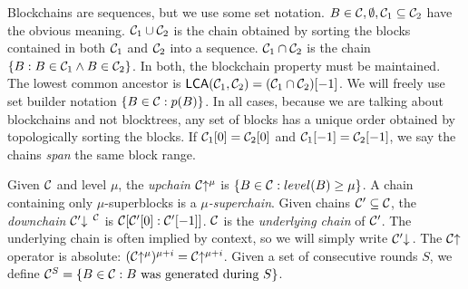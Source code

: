 Blockchains are sequences, but we use some set notation. $B \in \mathcal{C},
\emptyset, \mathcal{C}_1 \subseteq \mathcal{C}_2$ have the obvious meaning. $\mathcal{C}_1 \cup
\mathcal{C}_2$ is the chain obtained by sorting the blocks contained in both
$\mathcal{C}_1$ and $\mathcal{C}_2$ into a sequence. $\mathcal{C}_1 \cap \mathcal{C}_2$ is the chain
$\{B: B \in \mathcal{C}_1 \land B \in \mathcal{C}_2\}$. In both, the blockchain property
must be maintained. The lowest common ancestor is $\textsf{LCA}(\mathcal{C}_1,
\mathcal{C}_2) = (\mathcal{C}_1 \cap \mathcal{C}_2)[-1]$. We will freely use set builder
notation $\{B \in \mathcal{C}: p(B)\}$. In all cases, because we are talking about
blockchains and not blocktrees, any set of blocks has a unique order obtained by
topologically sorting the blocks. If $\mathcal{C}_1[0] = \mathcal{C}_2[0]$ and
$\mathcal{C}_1[-1] = \mathcal{C}_2[-1]$, we say the chains \textit{span} the same
block range.

Given $\mathcal{C}$ and level $\mu$, the \textit{upchain}
$\mathcal{C}\negthickspace\uparrow^\mu$ is $\{B \in \mathcal{C}: level(B) \geq \mu\}$. A chain
containing only $\mu$-superblocks is a $\mu$\textit{-superchain}. Given chains
$\mathcal{C}' \subseteq \mathcal{C}$, the \textit{downchain}
$\mathcal{C}'\negthickspace\downarrow\,^{\mathcal{C}}$ is $\mathcal{C}[\mathcal{C}'[0]:\mathcal{C}'[-1]]$. $\mathcal{C}$ is the
\textit{underlying chain} of $\mathcal{C}'$. The underlying chain is often implied by
context, so we will simply write $\mathcal{C}'\negthickspace\downarrow\,$. The $\mathcal{C}\negthickspace\uparrow$
operator is absolute: $(\mathcal{C}\negthickspace\uparrow^\mu)^{\mu + i} = \mathcal{C}\negthickspace\uparrow^{\mu +
i}$. Given a set of consecutive rounds $S$, we define $\mathcal{C}^S = \{B \in
\mathcal{C}: B \text{ was generated during } S\}$.
